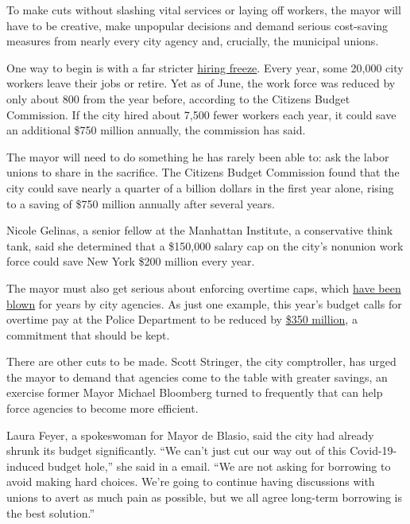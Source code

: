 To make cuts without slashing vital services or laying off workers, the
mayor will have to be creative, make unpopular decisions and demand
serious cost-saving measures from nearly every city agency and,
crucially, the municipal unions.

One way to begin is with a far stricter
\href{https://www.nytimes3xbfgragh.onion/2020/04/16/nyregion/nyc-budget-coronavirus.html}{hiring
freeze}. Every year, some 20,000 city workers leave their jobs or
retire. Yet as of June, the work force was reduced by only about 800
from the year before, according to the Citizens Budget Commission. If
the city hired about 7,500 fewer workers each year, it could save an
additional \$750 million annually, the commission has said.

The mayor will need to do something he has rarely been able to: ask the
labor unions to share in the sacrifice. The Citizens Budget Commission
found that the city could save nearly a quarter of a billion dollars in
the first year alone, rising to a saving of \$750 million annually after
several years.

Nicole Gelinas, a senior fellow at the Manhattan Institute, a
conservative think tank, said she determined that a \$150,000 salary cap
on the city's nonunion work force could save New York \$200 million
every year.

The mayor must also get serious about enforcing overtime caps, which
\href{https://cbcny.org/research/overboard-ot}{have been blown} for
years by city agencies. As just one example, this year's budget calls
for overtime pay at the Police Department to be reduced by
\href{https://www.nytimes3xbfgragh.onion/2020/07/01/opinion/new-york-city-budget-nypd.html}{\$350
million}, a commitment that should be kept.

There are other cuts to be made. Scott Stringer, the city comptroller,
has urged the mayor to demand that agencies come to the table with
greater savings, an exercise former Mayor Michael Bloomberg turned to
frequently that can help force agencies to become more efficient.

Laura Feyer, a spokeswoman for Mayor de Blasio, said the city had
already shrunk its budget significantly. ``We can't just cut our way out
of this Covid-19-induced budget hole,'' she said in a email. ``We are
not asking for borrowing to avoid making hard choices. We're going to
continue having discussions with unions to avert as much pain as
possible, but we all agree long-term borrowing is the best solution.''

